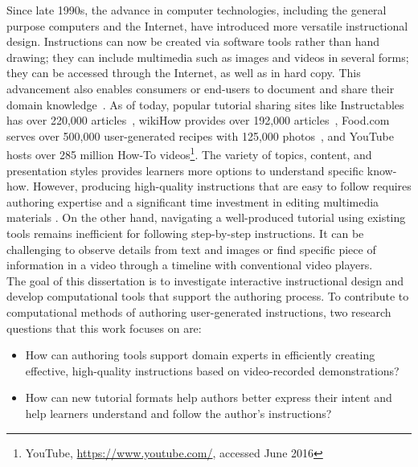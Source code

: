 Since late 1990s, the advance in computer technologies, including the general purpose computers and the Internet, have introduced more versatile instructional design. Instructions can now be created via software tools rather than hand drawing; they can include multimedia such as images and videos in several forms; they can be accessed through the Internet, as well as in hard copy.
%
This advancement also enables consumers or end-users to document and share their domain knowledge~\cite{Lafreniere:2012tl}. As of today, popular tutorial sharing sites like Instructables has over 220,000 articles~\cite{InstructablesProjects}, wikiHow provides over 192,000 articles~\cite{wikiHowStatistics}, Food.com serves over 500,000 user-generated recipes with 125,000 photos~\cite{FoodComAbout}, and YouTube hosts over 285 million How-To videos\footnote{YouTube, \url{https://www.youtube.com/}, accessed June 2016}.
%
The variety of topics, content, and presentation styles provides learners more options to understand specific know-how.
%
However, producing high-quality instructions that are easy to follow requires authoring expertise and a significant time investment in editing multimedia materials \cite{Muller:2009tw}.
%
On the other hand, navigating a well-produced tutorial using existing tools remains inefficient for following step-by-step instructions. It can be challenging to observe details from text and images or find specific piece of information in a video through a timeline with conventional video players.\\

The goal of this dissertation is to investigate interactive instructional design and develop computational tools that support the authoring process.
%
To contribute to computational methods of authoring user-generated instructions, two research questions that this work focuses on are:
\begin{itemize}
  \item How can authoring tools support domain experts in efficiently creating effective, high-quality instructions based on video-recorded demonstrations?

  \item How can new tutorial formats help authors better express their intent and help learners understand and follow the author's instructions?
\end{itemize}

